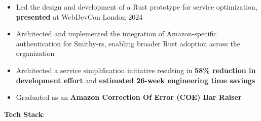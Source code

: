 \documentclass[10pt,a4paper,ragged2e]{altacv}
\begin{document}

\begin{fullwidth}
\makecvheader
\end{fullwidth}



\begin{itemize}
  \item Led the design and development of a Rust prototype for service optimization, \textbf{presented} at WebDevCon London 2024
  \item Architected and implemented the integration of Amazon-specific authentication for Smithy-rs, enabling broader Rust adoption across the organization
  \item Architected a service simplification initiative resulting in \textbf{58\% reduction in development effort} and \textbf{estimated 26-week engineering time savings}
  \item Graduated as an \textbf{Amazon Correction Of Error (COE) Bar Raiser}
\end{itemize}

\vspace{2mm}

\textbf{Tech Stack}:

\vspace{4mm}
\end{document}
